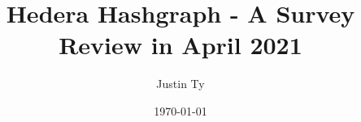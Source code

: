 \documentclass{article}
\begin{document}

\author{Justin Ty}
\title{Hedera Hashgraph - A Survey Review in April 2021 }
\date{\today}

\maketitle




\cite{einstein}
\printbibliography

\end{document}
